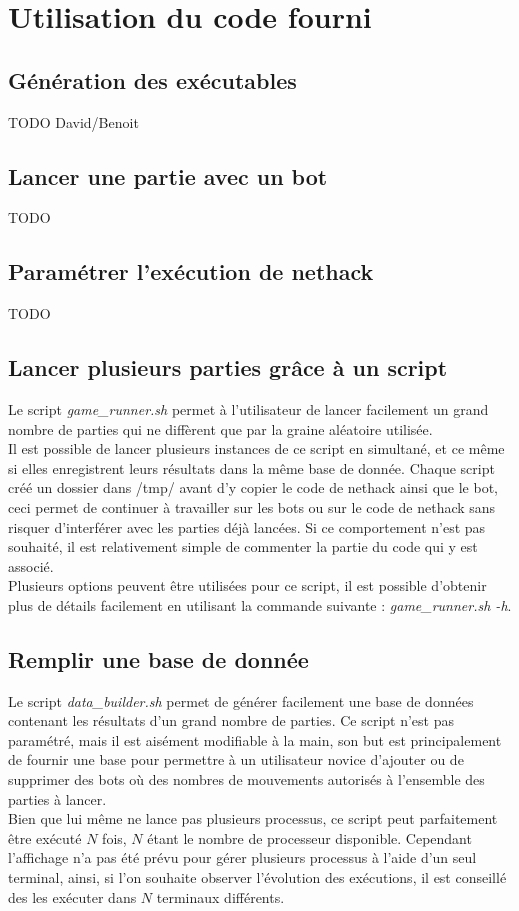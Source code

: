 \documentclass[10pt,a4paper]{report}
\begin{document}
\tableofcontents

\chapter{Utilisation du code fourni}
\section{Génération des exécutables}
TODO David/Benoit

\section{Lancer une partie avec un bot}
TODO

\section{Paramétrer l'exécution de nethack}
TODO

\section{Lancer plusieurs parties grâce à un script}
Le script \emph{game\_runner.sh} permet à l'utilisateur de lancer facilement
un grand nombre de parties qui ne diffèrent que par la graine aléatoire
utilisée.
\\
Il est possible de lancer plusieurs instances de ce script en simultané, et ce
même si elles enregistrent leurs résultats dans la même base de donnée. Chaque
script créé un dossier dans /tmp/ avant d'y copier le code de nethack ainsi que
le bot, ceci permet de continuer à travailler sur les bots ou sur le code de
nethack sans risquer d'interférer avec les parties déjà lancées. Si ce
comportement n'est pas souhaité, il est relativement simple de commenter la
partie du code qui y est associé.
\\
Plusieurs options peuvent être utilisées pour ce script, il est possible
d'obtenir plus de détails facilement en utilisant la commande suivante :
\emph{game\_runner.sh -h}.

\section{Remplir une base de donnée}
Le script \emph{data\_builder.sh} permet de générer facilement une base de
données contenant les résultats d'un grand nombre de parties. Ce script n'est
pas paramétré, mais il est aisément modifiable à la main, son but est
principalement de fournir une base pour permettre à un utilisateur novice
d'ajouter ou de supprimer des bots où des nombres de mouvements autorisés à
l'ensemble des parties à lancer.
\\
Bien que lui même ne lance pas plusieurs processus, ce script peut
parfaitement être exécuté $N$ fois, $N$ étant le nombre de processeur
disponible. Cependant l'affichage n'a pas été prévu pour gérer plusieurs
processus à l'aide d'un seul terminal, ainsi, si l'on souhaite observer
l'évolution des exécutions, il est conseillé des les exécuter dans $N$
terminaux différents.
\end{document}
